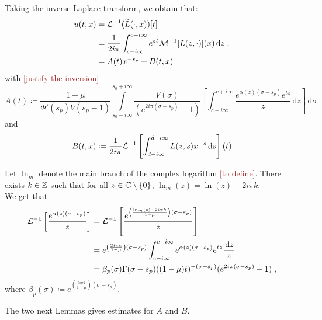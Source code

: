 \documentclass[11pt]{amsart}
\newcommand{\diff}{\,\mathrm{d}}
\newcommand{\ndr}[1]{\textcolor{brown}{[#1]}}
\begin{document}
Taking the inverse Laplace transform, we obtain that: 
\begin{align*}
     u(t,x) &= \Lcal^{-1}(\tilde L(\cdot, x))[t] \\
     &= \frac{1}{2i\pi } \int_{c-i\infty}^{c+i\infty} e^{zt}\Mcal^{-1}[L(z,\cdot)](x) \diff z
     \eqfinp\\
     &= A(t)x^{-s_p} + B(t,x)
\end{align*}
with \ndr{justify the inversion}
\begin{equation}
    A(t) \coloneqq\frac{1-\mu}{\Phi'(s_p) V(s_p-1)}
     \int\limits_{s_0-i\infty}^{s_0+i\infty}
     \frac{V(\sigma)
  }{(e^{2i\pi(\sigma-s_p)}-1)} \left[\int_{c-i\infty}^{c+i\infty} \frac{e^{ \alpha(z)(\sigma-s_p)}e^{tz}}{z}\diff z \right] \diff \sigma
  \label{def:A} 
\end{equation}
and 
\begin{equation}
    B(t,x) \coloneqq \frac{1}{2i\pi} \Lcal^{-1}\left[\int_{d-i\infty}^{d+i\infty} L(z,s)x^{-s}\diff s \right] (t)
\label{def:B}
\end{equation}

Let $\ln_{m}$ denote the main branch of the complex logarithm \ndr{to define}. There exists $k \in \mathbb{Z}$ such that for all $z \in \mathbb{C} \setminus \{0\}$, $\ln_m(z) = \ln(z) + 2i\pi k. $ \\
We get that 
\begin{subequations}
\begin{align}
    \Lcal^{-1}\left[ \frac{e^{ \alpha(z)(\sigma-s_p)}}{z}  \right]
    &= 
    \Lcal^{-1}\left[ \frac{e^{ \left( \frac{\ln_m(z) + 2i\pi k}{1-\mu} \right) (\sigma-s_p)}}{z}  \right] \\
    &= 
    e^{ \left( \frac{2i\pi k}{1-\mu} \right) (\sigma-s_p)}
    \int_{c-i\infty}^{c+i\infty} e^{ \alpha(z)(\sigma-s_p)}e^{tz}\frac{\diff z}{z}\\
    &= \beta_p(\sigma) \Gamma(\sigma-s_p)((1-\mu)t)^{-(\sigma-s_p)}(e^{2i\pi(\sigma-s_p)}-1)
    \eqfinv
\end{align}
\label{eq:calcLaplInv}
\end{subequations}
where $\beta_p(\sigma) \coloneqq e^{ \left( \frac{2i\pi k}{1-\mu} \right) (\sigma-s_p)}$. 

The two next Lemmas gives estimates for $A$ and $B$. 
\end{document}
